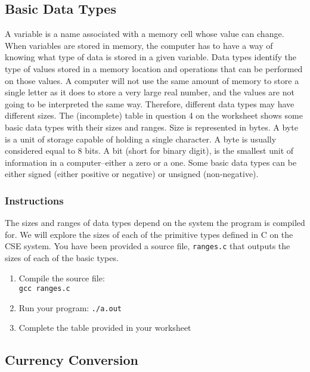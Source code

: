 \documentclass[12pt]{scrartcl}
\begin{document}
\subsection{Basic Data Types}

A variable is a name associated with a memory cell whose value can change.
When variables are stored in memory, the computer has to have a way of
knowing what type of data is stored in a given variable.  Data types identify
the type of values stored in a memory location and operations that can be
performed on those values.  A computer will not use the same amount of
memory to store a single letter as it does to store a very large real number,
and the values are not going to be interpreted the same way.  Therefore,
different data types may have different sizes. The (incomplete) table in
question 4 on the worksheet shows some basic data types with their
sizes and ranges.  Size is represented in bytes.  A byte is a unit of storage
capable of holding a single character.  A byte is usually considered equal
to 8 bits.  A bit (short for binary digit), is the smallest unit of information in
a computer--either a zero or a one.  Some basic data types can be either
signed (either positive or negative) or unsigned (non-negative).

\subsubsection*{Instructions}

The sizes and ranges of data types depend on the system the program is
compiled for.  We will explore the sizes of each of the primitive types defined
in C on the CSE system.  You have been provided a source file,
\texttt{ranges.c} that outputs the sizes of each of the basic types.

\begin{enumerate}
  \item Compile the source file:\\
  	\texttt{gcc ranges.c}
  \item Run your program:
  	\texttt{./a.out}
  \item Complete the table provided in your worksheet
 \end{enumerate}

\subsection{Currency Conversion}
\end{document}
